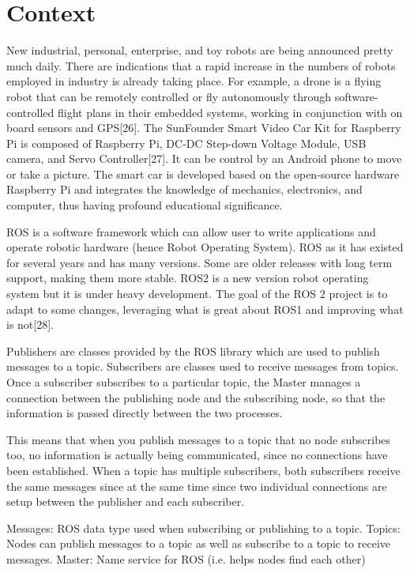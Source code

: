 \documentclass{mproj}
\begin{document}
\section{Context}
New industrial, personal, enterprise, and toy robots are being announced pretty much daily. There are indications that a rapid increase in the numbers of robots employed in industry is already taking place. For example, a drone is a flying robot that can be remotely controlled or fly autonomously through software-controlled flight plans in their embedded systems, working in conjunction with on board sensors and GPS[26]. The SunFounder Smart Video Car Kit for Raspberry Pi is composed of Raspberry Pi, DC-DC Step-down Voltage Module, USB camera, and  Servo Controller[27]. It can be control by an Android phone to move or take a picture. The smart car is developed based on the open-source hardware Raspberry Pi and integrates the knowledge of mechanics, electronics, and computer, thus having profound educational significance.

ROS is a software framework which can allow user to write applications and operate robotic hardware (hence Robot Operating System). ROS as it has existed for several years and has many versions. Some are older releases with long term support, making them more stable. ROS2 is a new version robot operating system but it is under heavy development. The goal of the ROS 2 project is to adapt to some changes, leveraging what is great about ROS1 and improving what is not[28].

Publishers are classes provided by the ROS library which are used to publish messages to a topic. Subscribers are classes used to receive messages from topics. Once a subscriber subscribes to a particular topic, the Master manages a connection between the publishing node and the subscribing node, so that the information is passed directly between the two processes.

This means that when you publish messages to a topic that no node subscribes too, no information is actually being communicated, since no connections have been established. When a topic has multiple subscribers, both subscribers receive the same messages since at the same time since two individual connections are setup between the publisher and each subscriber.

Messages: ROS data type used when subscribing or publishing to a topic.
Topics: Nodes can publish messages to a topic as well as subscribe to a topic to receive messages.
Master: Name service for ROS (i.e. helps nodes find each other)
\end{document}
